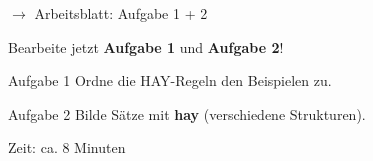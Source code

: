 \documentclass[aspectratio=169, 11pt]{beamer}
\newcommand{\es}[1]{\textbf{\textcolor{spanischrot}{#1}}}
\begin{document}
\begin{frame}{$\rightarrow$ Arbeitsblatt: Aufgabe 1 + 2}

\begin{center}
{\Large Bearbeite jetzt \textbf{Aufgabe 1} und \textbf{Aufgabe 2}!}
\end{center}

\vspace{0.8cm}

\begin{block}{Aufgabe 1}
Ordne die HAY-Regeln den Beispielen zu.
\end{block}

\begin{block}{Aufgabe 2}
Bilde Sätze mit \es{hay} (verschiedene Strukturen).
\end{block}

\vspace{0.5cm}

\begin{center}
{\small\textcolor{dunkelgrau}{Zeit: ca. 8 Minuten}}
\end{center}

\end{frame}
\end{document}
